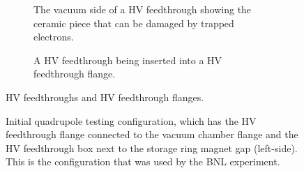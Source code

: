 \begin{figure}[]
	\centering
	\begin{subfigure}{\columnwidth}
		\caption{The vacuum side of a HV feedthrough showing the ceramic piece that can be damaged by trapped electrons.}\label{fig:hv_feedthrough}
	\end{subfigure}
	\begin{subfigure}{\columnwidth}
		\caption{A HV feedthrough being inserted into a HV feedthrough flange.}\label{fig:hv_feedthrough_insert}
	\end{subfigure}
	\caption{HV feedthroughs and HV feedthrough flanges.}\label{fig:hv_feedthrough_and_flange}
\end{figure}

\begin{figure}[]
	\centering
	\caption{Initial quadrupole testing configuration, which has the HV feedthrough flange connected to the vacuum chamber flange and the HV feedthrough box next to the storage ring magnet gap (left-side). This is the configuration that was used by the BNL experiment.}\label{fig:no_extension}
\end{figure}

